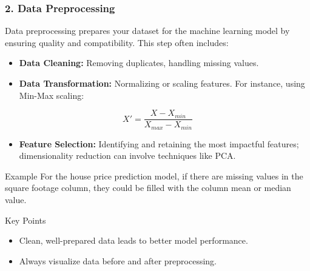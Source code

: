 \documentclass[aspectratio=169]{beamer}
\begin{document}
\begin{frame}
    \frametitle{2. Data Preprocessing}
    Data preprocessing prepares your dataset for the machine learning model by ensuring quality and compatibility. This step often includes:
    
    \begin{itemize}
        \item \textbf{Data Cleaning:} Removing duplicates, handling missing values.
        \item \textbf{Data Transformation:} Normalizing or scaling features. For instance, using Min-Max scaling:
        \end{itemize}
        
        \begin{equation}
            X' = \frac{X - X_{min}}{X_{max} - X_{min}}
        \end{equation}

        \begin{itemize}
            \item \textbf{Feature Selection:} Identifying and retaining the most impactful features; dimensionality reduction can involve techniques like PCA.
        \end{itemize}

    \begin{block}{Example}
        For the house price prediction model, if there are missing values in the square footage column, they could be filled with the column mean or median value.
    \end{block}
    
    \begin{block}{Key Points}
        \begin{itemize}
            \item Clean, well-prepared data leads to better model performance.
            \item Always visualize data before and after preprocessing.
        \end{itemize}
    \end{block}
\end{frame}
\end{document}
